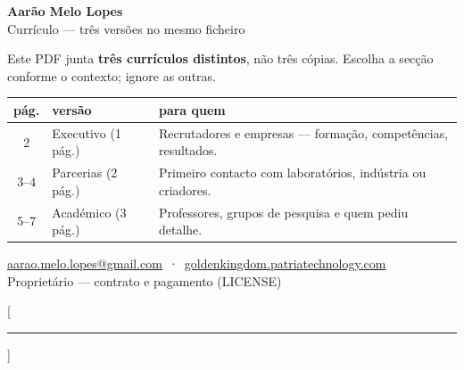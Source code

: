 \documentclass[11pt,a4paper]{article}
\begin{document}

\begin{center}
{\LARGE\bfseries Aarão Melo Lopes}\\[6pt]
{\color{cinza}Currículo --- três versões no mesmo ficheiro}\\[14pt]
\end{center}

\noindent Este PDF junta \textbf{três currículos distintos}, não três cópias.
Escolha a secção conforme o contexto; ignore as outras.

\medskip
\begin{center}
\begin{tabular}{@{}clp{8.2cm}@{}}
\toprule
\textbf{pág.} & \textbf{versão} & \textbf{para quem} \\
\midrule
2 & Executivo (1\,pág.) &
Recrutadores e empresas --- formação, competências, resultados. \\[4pt]
3--4 & Parcerias (2\,pág.) &
Primeiro contacto com laboratórios, indústria ou criadores. \\[4pt]
5--7 & Académico (3\,pág.) &
Professores, grupos de pesquisa e quem pediu detalhe. \\
\bottomrule
\end{tabular}
\end{center}

\medskip
{}
\par

\vfill
\begin{center}
{\footnotesize
\href{mailto:aarao.melo.lopes@gmail.com}{aarao.melo.lopes@gmail.com}
\,·\,
\href{https://goldenkingdom.patriatechnology.com}{goldenkingdom.patriatechnology.com}
\\[4pt]
Proprietário — contrato e pagamento (LICENSE)}
\end{center}

\newpage
\titlespacing{\section}{0pt}{7pt}{3pt}
\titleformat{\section}{\normalsize\bfseries}{}{0pt}{}[\vspace{-5pt}\rule{\textwidth}{0.4pt}]
\end{document}
